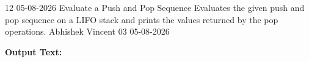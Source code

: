 \clearpage
\label{prog:12}
\programhead
  {12}
  {05-08-2026}
  {Evaluate a Push and Pop Sequence}
  {Evaluates the given push and pop sequence on a LIFO stack and prints the values returned by the pop operations.}
  {Abhishek Vincent}
  {03}
  {05-08-2026}

\divider
\textbf{Output Text:}\par
\vspace{2pt}

